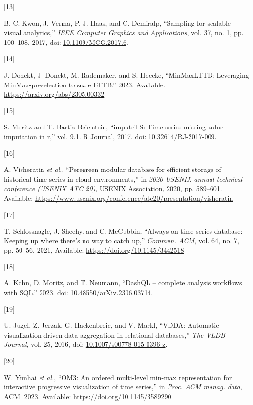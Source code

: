 \documentclass{article}
\newlength{\cslhangindent}
\newlength{\csllabelwidth}
\newlength{\cslentryspacingunit} %
\newenvironment{CSLReferences}[2] %
 {%
  \setlength{\parindent}{0pt}
  \ifodd #1
  \let\oldpar\par
  \def\par{\hangindent=\cslhangindent\oldpar}
  \fi
  \setlength{\parskip}{#2\cslentryspacingunit}
 }%
 {}
\newcommand{\CSLLeftMargin}[1]{\parbox[t]{\csllabelwidth}{#1}}
\newcommand{\CSLRightInline}[1]{\parbox[t]{\linewidth - \csllabelwidth}{#1}\break}
\begin{document}
\begin{CSLReferences}{0}{0}
\leavevmode{}%
\CSLLeftMargin{{[}13{]} }
\CSLRightInline{B. C. Kwon, J. Verma, P. J. Haas, and C. Demiralp,
{``Sampling for scalable visual analytics,''} \emph{IEEE Computer
Graphics and Applications}, vol. 37, no. 1, pp. 100--108, 2017, doi:
\href{https://doi.org/10.1109/MCG.2017.6}{10.1109/MCG.2017.6}.}

\leavevmode{}%
\CSLLeftMargin{{[}14{]} }
\CSLRightInline{J. Donckt, J. Donckt, M. Rademaker, and S. Hoecke,
{``MinMaxLTTB: Leveraging MinMax-preselection to scale LTTB.''} 2023.
Available: \url{https://arxiv.org/abs/2305.00332}}

\leavevmode{}%
\CSLLeftMargin{{[}15{]} }
\CSLRightInline{S. Moritz and T. Bartiz-Beielstein, {``imputeTS: Time
series missing value imputation in r,''} vol. 9.1. R Journal, 2017. doi:
\href{https://doi.org/10.32614/RJ-2017-009}{10.32614/RJ-2017-009}.}

\leavevmode{}%
\CSLLeftMargin{{[}16{]} }
\CSLRightInline{A. Visheratin \emph{et al.}, {``Peregreen {\textendash}
modular database for efficient storage of historical time series in
cloud environments,''} in \emph{2020 USENIX annual technical conference
(USENIX ATC 20)}, USENIX Association, 2020, pp. 589--601. Available:
\url{https://www.usenix.org/conference/atc20/presentation/visheratin}}

\leavevmode{}%
\CSLLeftMargin{{[}17{]} }
\CSLRightInline{T. Schlossnagle, J. Sheehy, and C. McCubbin,
{``Always-on time-series database: Keeping up where there's no way to
catch up,''} \emph{Commun. ACM}, vol. 64, no. 7, pp. 50--56, 2021,
Available: \url{https://doi.org/10.1145/3442518}}

\leavevmode{}%
\CSLLeftMargin{{[}18{]} }
\CSLRightInline{A. Kohn, D. Moritz, and T. Neumann, {``DashQL --
complete analysis workflows with SQL.''} 2023. doi:
\href{https://doi.org/10.48550/arXiv.2306.03714}{10.48550/arXiv.2306.03714}.}

\leavevmode{}%
\CSLLeftMargin{{[}19{]} }
\CSLRightInline{U. Jugel, Z. Jerzak, G. Hackenbroic, and V. Markl,
{``VDDA: Automatic visualization-driven data aggregation in relational
databases,''} \emph{The VLDB Journal}, vol. 25, 2016, doi:
\href{https://doi.org/10.1007/s00778-015-0396-z}{10.1007/s00778-015-0396-z}.}

\leavevmode{}%
\CSLLeftMargin{{[}20{]} }
\CSLRightInline{W. Yunhai \emph{et al.}, {``OM3: An ordered multi-level
min-max representation for interactive progressive visualization of time
series,''} in \emph{Proc. ACM manag. data}, ACM, 2023. Available:
\url{https://doi.org/10.1145/3589290}}


\end{CSLReferences}
\end{document}
